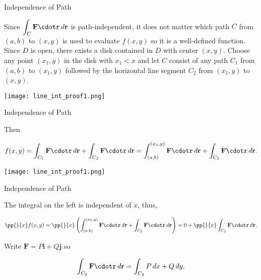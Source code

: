 \documentclass[11pt,english,
handout
]{beamer}
\begin{document}
\begin{frame}[t]{Independence of Path}
\small

\begin{proofs}
Since $\displaystyle \int_C\mathbf{F}\cdotr\,d\mathbf{r}$ is path-independent, it does not matter which path $C$ from $(a,b)$ to $(x,y)$ is used to evaluate $f(x,y)$ so it is a well-defined function. \pause Since $D$ is open, there exists a disk contained in $D$ with center $(x,y)$. Choose any point $(x_1,y)$ in the disk with $x_1<x$ and let $C$ consist of any path $C_1$ from $(a,b)$ to $(x_1,y)$ followed by the horizontal line segment $C_2$ from $(x_1,y)$ to $(x,y)$.

\vspace{0.5mm}
\begin{center}
\texttt{[image: line\_int\_proof1.png]}
\end{center}
\end{proofs}
\end{frame}








\begin{frame}[t]{Independence of Path}
\small

\begin{proofs}
Then

\[
f(x,y)=\int_{C_1}\mathbf{F}\cdotr\,d\mathbf{r}+\int_{C_2}\mathbf{F}\cdotr\,d\mathbf{r}=\int_{(a,b)}^{(x_1,y)}\mathbf{F}\cdotr\,d\mathbf{r}+\int_{C_2}\mathbf{F}\cdotr\,d\mathbf{r}.
\]

\lspace
\begin{center}
\texttt{[image: line\_int\_proof1.png]}
\end{center}
\end{proofs}
\end{frame}









\begin{frame}{Independence of Path}
\small

\begin{proofs}
The integral on the left is independent of $x$, thus,

\[
\pp{}{x}f(x,y)=\pp{}{x}\left(\int_{(a,b)}^{(x_1,y)}\mathbf{F}\cdotr\,d\mathbf{r}+\int_{C_2}\mathbf{F}\cdotr\,d\mathbf{r}\right)=0+\pp{}{x}\int_{C_2}\mathbf{F}\cdotr\,d\mathbf{r}.
\]\pause

\lspace
Write $\mathbf{F}=P\mathbf{i}+Q\mathbf{j}$ so

\[
\int_{C_2}\mathbf{F}\cdotr\,d\mathbf{r}=\int_{C_2}P\,dx+Q\,dy.
\]

\end{proofs}
\end{frame}
\end{document}
